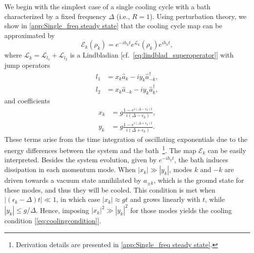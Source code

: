 \documentclass[aps,prx,twocolumn,superscriptaddress,nofootinbib,nolongbibliography,nobalancelastpage,10pt,floatfix]{revtex4-2}
\begin{document}
We begin with the simplest case of a single cooling cycle with a bath characterized by a fixed frequency $\Delta$ (i.e., $R=1$). Using perturbation theory, we show in \cref{app:Single_freq steady state} that the cooling cycle map can be approximated by
\begin{equation}
    \mathcal{E}_k(\rho_k) =  e^{-i {h}_k t} e^{\mathcal{L}_k}(\rho_k) e^{i {h}_k t},
    \label{eq:LindbladE}
\end{equation}
where $\mathcal{L}_k=\mathcal{L}_{l_1}+\mathcal{L}_{l_2}$ is a Lindbladian [cf.~\cref{eq:lindblad_superoperator}] with jump operators
\begin{align}
    l_1 &= x_k \hat{a}_{k} - i y_k \hat{a}_{-k}^\dag, \label{eq:L1_def}\\
    l_2 &= x_k \hat{a}_{-k} - i y_k \hat{a}_k^\dag, \label{eq:L2_def}
\end{align}
and coefficients
\begin{align}
    x_k &= g\frac{1 - e^{i (\Delta-\epsilon_k) t}}{i (\Delta-\epsilon_k)}, \label{eq:xT_def}\\
    y_k &= g\frac{1 - e^{i (\Delta+\epsilon_k) t}}{i (\Delta+\epsilon_k)}. \label{eq:yT_def}
\end{align}
These terms arise from the time integration of oscillating exponentials due to the energy differences between the system and the bath~\footnote{Derivation details are presented in \cref{app:Single_freq steady state}.}.
The map $\mathcal{E}_k$ can be easily interpreted. Besides the system evolution, given by $e^{-i h_k t}$, the bath induces dissipation in each momentum mode. When $|x_k|\gg |y_k|$, modes $k$ and $-k$ are driven towards a vacuum state annihilated by $\hat{a}_{\pm k}$, which is the ground state for these modes, and thus they will be cooled. This condition is met when $|(\epsilon_k-\Delta)t|\ll 1$, in which case $|x_k|\approx gt$ and grows linearly with $t$, while $|y_k|\le g/\Delta$. Hence, imposing $|x_k|^2\gg |y_k|^2$ for those modes yields the cooling condition [\cref{eq:coolingcondition}].
\end{document}
